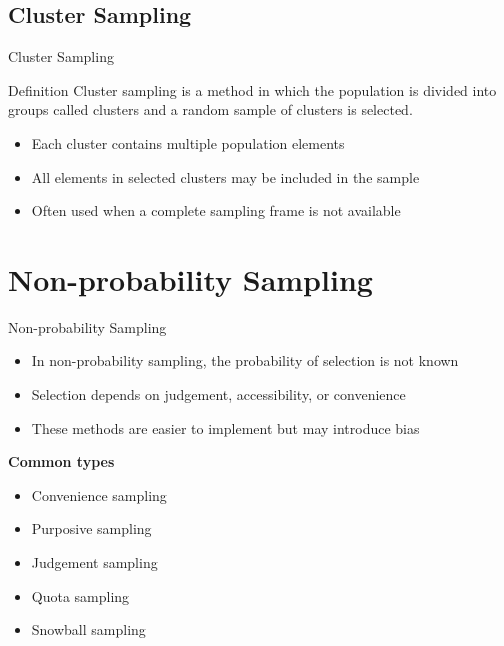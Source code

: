 \documentclass[12pt, aspectratio=169]{beamer}
\begin{document}
    \subsection{Cluster Sampling}

    \begin{frame}{Cluster Sampling}
        \begin{block}{Definition}
            Cluster sampling is a method in which the population is divided into groups called clusters and a random sample of clusters is selected.
        \end{block}

        \begin{itemize}
            \item Each cluster contains multiple population elements

            \item All elements in selected clusters may be included in the sample

            \item Often used when a complete sampling frame is not available
        \end{itemize}
    \end{frame}


    \section{Non-probability Sampling}

    \begin{frame}{Non-probability Sampling}
        \begin{itemize}
            \item In non-probability sampling, the probability of selection is not known

            \item Selection depends on judgement, accessibility, or convenience

            \item These methods are easier to implement but may introduce bias
        \end{itemize}

        \textbf{Common types}

        \begin{itemize}
            \item Convenience sampling
            \item Purposive sampling
            \item Judgement sampling
            \item Quota sampling
            \item Snowball sampling
        \end{itemize}
    \end{frame}
\end{document}
